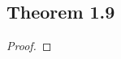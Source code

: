 \documentclass[../../main.tex]{subfiles}
\begin{document}
\subsection{Theorem 1.9}
\begin{wts}

\end{wts}
\begin{proof}

\end{proof}
\end{document}
